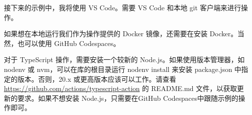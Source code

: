 
接下来的示例中，我将使用 VS Code。需要 VS Code 和本地 git 客户端来进行操作。

如果想在本地运行我们作为操作提供的 Docker 镜像，还需要在安装 Docker。当然，也可以使用 GitHub Codespaces。

对于 TypeScript 操作，需要安装一个较新的 Node.js。如果使用版本管理器，如 nodenv 或 nvm，可以在库的根目录运行 nodenv install 来安装 package.json 中指定的版本。否则，20.x 或更高版本应该可以工作。请查看 \url{https://github.com/actions/typescript-action} 的 README.md 文件，以获取更新的要求。如果不想安装 Node.js，只需要在GitHub Codespaces中跟随示例的操作即可。
